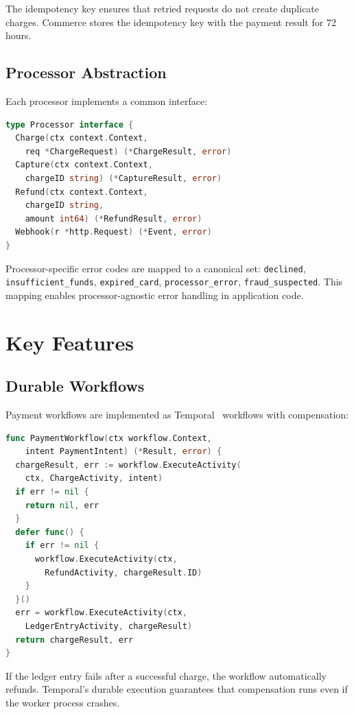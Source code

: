 \documentclass[11pt,twocolumn]{article}
\begin{document}
The idempotency key ensures that retried requests do not create duplicate charges. Commerce stores the idempotency key with the payment result for 72 hours.

\subsection{Processor Abstraction}

Each processor implements a common interface:

\begin{lstlisting}[language=Go]
type Processor interface {
  Charge(ctx context.Context,
    req *ChargeRequest) (*ChargeResult, error)
  Capture(ctx context.Context,
    chargeID string) (*CaptureResult, error)
  Refund(ctx context.Context,
    chargeID string,
    amount int64) (*RefundResult, error)
  Webhook(r *http.Request) (*Event, error)
}
\end{lstlisting}

Processor-specific error codes are mapped to a canonical set: \texttt{declined}, \texttt{insufficient\_funds}, \texttt{expired\_card}, \texttt{processor\_error}, \texttt{fraud\_suspected}. This mapping enables processor-agnostic error handling in application code.

\section{Key Features}

\subsection{Durable Workflows}

Payment workflows are implemented as Temporal~\cite{temporal2020} workflows with compensation:

\begin{lstlisting}[language=Go]
func PaymentWorkflow(ctx workflow.Context,
    intent PaymentIntent) (*Result, error) {
  chargeResult, err := workflow.ExecuteActivity(
    ctx, ChargeActivity, intent)
  if err != nil {
    return nil, err
  }
  defer func() {
    if err != nil {
      workflow.ExecuteActivity(ctx,
        RefundActivity, chargeResult.ID)
    }
  }()
  err = workflow.ExecuteActivity(ctx,
    LedgerEntryActivity, chargeResult)
  return chargeResult, err
}
\end{lstlisting}

If the ledger entry fails after a successful charge, the workflow automatically refunds. Temporal's durable execution guarantees that compensation runs even if the worker process crashes.
\end{document}
